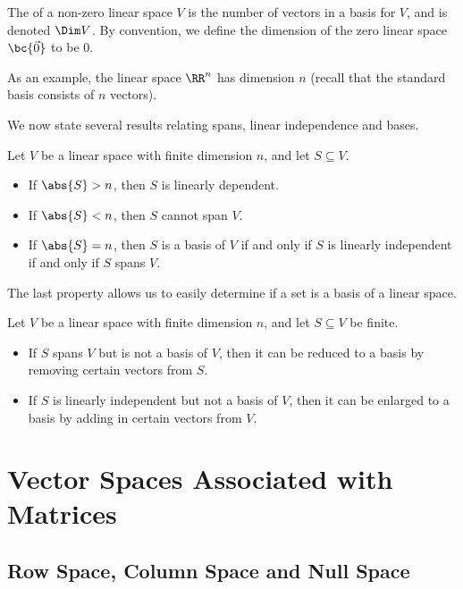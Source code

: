 \begin{definition}
    The  of a non-zero linear space $V$ is the number of vectors in a basis for $V$, and is denoted $\Dim V$. By convention, we define the dimension of the zero linear space $\bc{\vec 0}$ to be 0.
\end{definition}

As an example, the linear space $\RR^n$ has dimension $n$ (recall that the standard basis consists of $n$ vectors).

We now state several results relating spans, linear independence and bases.

\begin{proposition}
    Let $V$ be a linear space with finite dimension $n$, and let $S \subseteq V$.
    \begin{itemize}
        \item If $\abs{S} > n$, then $S$ is linearly dependent.
        \item If $\abs{S} < n$, then $S$ cannot span $V$.
        \item If $\abs{S} = n$, then $S$ is a basis of $V$ if and only if $S$ is linearly independent if and only if $S$ spans $V$.
    \end{itemize}
\end{proposition}

The last property allows us to easily determine if a set is a basis of a linear space.

\begin{proposition}
    Let $V$ be a linear space with finite dimension $n$, and let $S \subseteq V$ be finite.
    \begin{itemize}
        \item If $S$ spans $V$ but is not a basis of $V$, then it can be reduced to a basis by removing certain vectors from $S$.
        \item If $S$ is linearly independent but not a basis of $V$, then it can be enlarged to a basis by adding in certain vectors from $V$.
    \end{itemize}
\end{proposition}

\section{Vector Spaces Associated with Matrices}

\subsection{Row Space, Column Space and Null Space}

